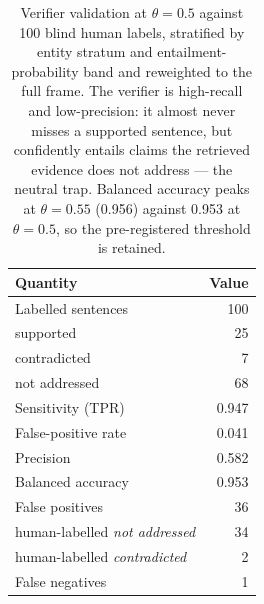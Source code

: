 \begin{table}[t]
  \centering
  \small
  \begin{tabular}{lr}
    \toprule
    \textbf{Quantity} & \textbf{Value} \\
    \midrule
    Labelled sentences & 100 \\
    \quad supported & 25 \\
    \quad contradicted & 7 \\
    \quad not addressed & 68 \\
    \midrule
    Sensitivity (TPR) & 0.947 \\
    False-positive rate & 0.041 \\
    Precision & 0.582 \\
    Balanced accuracy & 0.953 \\
    \midrule
    False positives & 36 \\
    \quad human-labelled \emph{not addressed} & 34 \\
    \quad human-labelled \emph{contradicted} & 2 \\
    False negatives & 1 \\
    \bottomrule
  \end{tabular}
  \caption{Verifier validation at $\theta=0.5$ against 100 blind human labels, stratified by entity stratum and entailment-probability band and reweighted to the full frame. The verifier is high-recall and low-precision: it almost never misses a supported sentence, but confidently entails claims the retrieved evidence does not address --- the neutral trap. Balanced accuracy peaks at $\theta=0.55$ (0.956) against 0.953 at $\theta=0.5$, so the pre-registered threshold is retained.}
  \label{tab:verifier}
\end{table}

